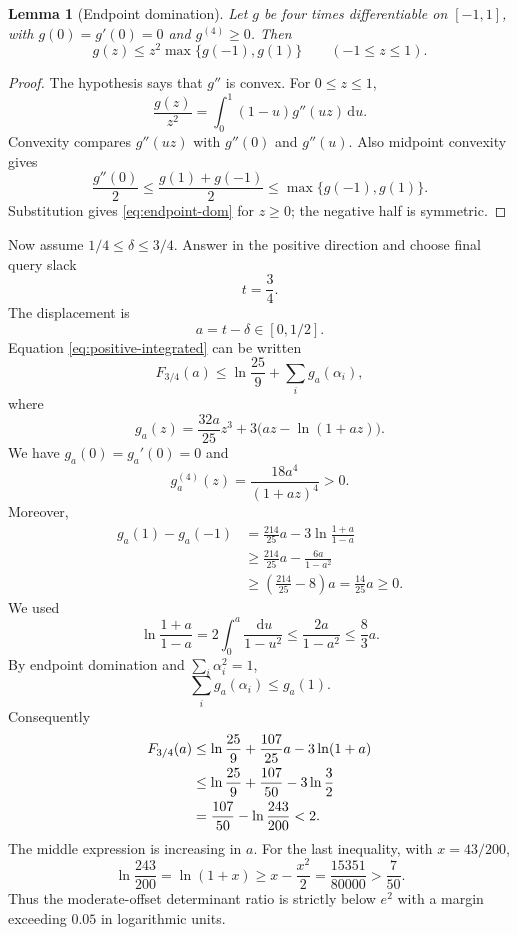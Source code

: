 \documentclass[11pt]{article}
\newtheorem{lemma}[theorem]{Lemma}
\theoremstyle{definition}
\newcommand{\1}{\mathbf{1}}
\newcommand{\dd}{\,\mathrm{d}}
\begin{document}
\begin{lemma}[Endpoint domination]
Let $g$ be four times differentiable on $[-1,1]$, with $g(0)=g'(0)=0$ and $g^{(4)}\ge0$.  Then
\begin{equation}
g(z)\le z^2\max\{g(-1),g(1)\}
\qquad(-1\le z\le1).
\label{eq:endpoint-dom}
\end{equation}
\end{lemma}

\begin{proof}
The hypothesis says that $g''$ is convex.  For $0\le z\le1$,
\[
\frac{g(z)}{z^2}=\int_0^1(1-u)g''(uz)\dd u.
\]
Convexity compares $g''(uz)$ with $g''(0)$ and $g''(u)$.  Also midpoint convexity gives
\[
\frac{g''(0)}2
\le\frac{g(1)+g(-1)}2
\le\max\{g(-1),g(1)\}.
\]
Substitution gives \eqref{eq:endpoint-dom} for $z\ge0$; the negative half is symmetric.
\end{proof}

Now assume $1/4\le\delta\le3/4$.  Answer in the positive direction and choose final query slack
\[
t=\frac34.
\]
The displacement is
\[
a=t-\delta\in[0,1/2].
\]
Equation \eqref{eq:positive-integrated} can be written
\[
F_{3/4}(a)\le\ln\frac{25}{9}+\sum_i g_a(\alpha_i),
\]
where
\begin{equation}
g_a(z)=\frac{32a}{25}z^3+3\bigl(az-\ln(1+az)\bigr).
\label{eq:ga}
\end{equation}
We have $g_a(0)=g_a'(0)=0$ and
\[
g_a^{(4)}(z)=\frac{18a^4}{(1+az)^4}>0.
\]
Moreover,
\begin{align*}
g_a(1)-g_a(-1)
&=\frac{214}{25}a-3\ln\frac{1+a}{1-a}\\
&\ge\frac{214}{25}a-\frac{6a}{1-a^2}\\
&\ge\left(\frac{214}{25}-8\right)a
=\frac{14}{25}a\ge0.
\end{align*}
We used
\[
\ln\frac{1+a}{1-a}=2\int_0^a\frac{\dd u}{1-u^2}
\le\frac{2a}{1-a^2}
\le\frac83a.
\]
By endpoint domination and $\sum_i\alpha_i^2=1$,
\[
\sum_i g_a(\alpha_i)\le g_a(1).
\]
Consequently
\begin{align}
F_{3/4}(a)
&\le\ln\frac{25}{9}+\frac{107}{25}a-3\ln(1+a)\notag\\
&\le\ln\frac{25}{9}+\frac{107}{50}-3\ln\frac32\notag\\
&=\frac{107}{50}-\ln\frac{243}{200}<2.
\label{eq:moderate-bound}
\end{align}
The middle expression is increasing in $a$.  For the last inequality, with $x=43/200$,
\[
\ln\frac{243}{200}=\ln(1+x)
\ge x-\frac{x^2}{2}
=\frac{15351}{80000}
>\frac7{50}.
\]
Thus the moderate-offset determinant ratio is strictly below $e^2$ with a margin exceeding $0.05$ in logarithmic units.
\end{document}
